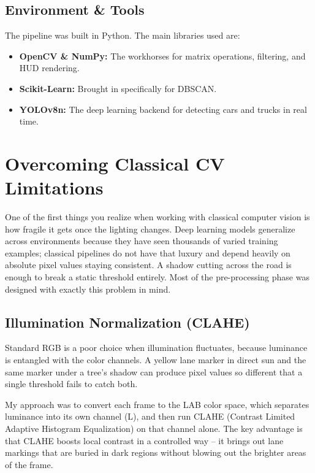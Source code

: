 \documentclass[a4paper, 11pt]{article}
\begin{document}
	\subsection{Environment \& Tools}
	The pipeline was built in Python. The main libraries used are:
	\begin{itemize}
		\item \textbf{OpenCV \& NumPy:} The workhorses for matrix operations, filtering, and HUD rendering.
		\item \textbf{Scikit-Learn:} Brought in specifically for DBSCAN.
		\item \textbf{YOLOv8n:} The deep learning backend for detecting cars and trucks in real time.
	\end{itemize}
	
	\section{Overcoming Classical CV Limitations}
	One of the first things you realize when working with classical computer vision is how fragile it gets once the lighting changes. Deep learning models generalize across environments because they have seen thousands of varied training examples; classical pipelines do not have that luxury and depend heavily on absolute pixel values staying consistent. A shadow cutting across the road is enough to break a static threshold entirely. Most of the pre-processing phase was designed with exactly this problem in mind.
	
	\subsection{Illumination Normalization (CLAHE)}
	Standard RGB is a poor choice when illumination fluctuates, because luminance is entangled with the color channels. A yellow lane marker in direct sun and the same marker under a tree's shadow can produce pixel values so different that a single threshold fails to catch both.
	
	My approach was to convert each frame to the LAB color space, which separates luminance into its own channel (L), and then run CLAHE (Contrast Limited Adaptive Histogram Equalization) on that channel alone. The key advantage is that CLAHE boosts local contrast in a controlled way -- it brings out lane markings that are buried in dark regions without blowing out the brighter areas of the frame.
	
\end{document}
